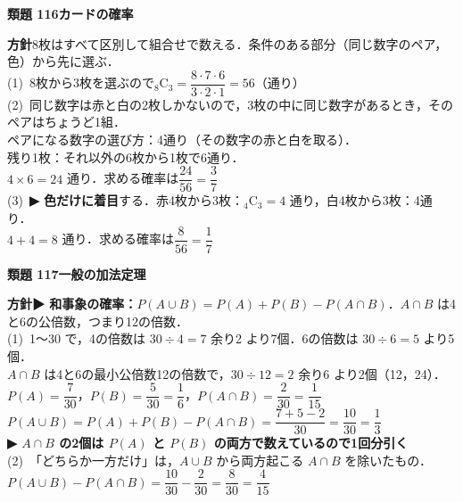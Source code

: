 \documentclass[a4paper,11pt]{ltjsarticle}
\newcommand{\ans}[2]{\Needspace{5\baselineskip}\vspace{6pt}%
  {\sffamily\bfseries 類題 #1\quad #2}\par}
\newcommand{\point}[1]{\textsf{\bfseries ▶ #1}}
\begin{document}
\ans{116}{カードの確率}
\begin{kai}
\textbf{方針}\quad 8枚はすべて区別して組合せで数える．条件のある部分（同じ数字のペア，色）から先に選ぶ．\\[2pt]
(1)\ 8枚から3枚を選ぶので\quad ${}_8\mathrm C_3=\dfrac{8\cdot7\cdot6}{3\cdot2\cdot1}=56$（通り）\\[2pt]
(2)\ 同じ数字は赤と白の2枚しかないので，3枚の中に同じ数字があるとき，そのペアはちょうど1組．\\
\hspace*{1.5em}ペアになる数字の選び方：4通り（その数字の赤と白を取る）．\\
\hspace*{1.5em}残り1枚：それ以外の6枚から1枚で6通り．\\
\hspace*{1.5em}$4\times6=24$ 通り．\quad 求める確率は\quad $\dfrac{24}{56}=\dfrac37$\\[2pt]
(3)\ \point{色だけに着目}する．赤4枚から3枚：${}_4\mathrm C_3=4$ 通り，白4枚から3枚：4通り．\\
\hspace*{1.5em}$4+4=8$ 通り．\quad 求める確率は\quad $\dfrac{8}{56}=\dfrac17$
\end{kai}

\ans{117}{一般の加法定理}
\begin{kai}
\textbf{方針}\quad \point{和事象の確率：$P(A\cup B)=P(A)+P(B)-P(A\cap B)$}．$A\cap B$ は4と6の公倍数，つまり12の倍数．\\[2pt]
(1)\ 1〜30 で，4の倍数は $30\div4=7$ 余り2 より7個．6の倍数は $30\div6=5$ より5個．\\
\hspace*{1.5em}$A\cap B$ は4と6の最小公倍数12の倍数で，$30\div12=2$ 余り6 より2個（12，24）．\\[2pt]
\hspace*{1.5em}$P(A)=\dfrac{7}{30}$，\quad $P(B)=\dfrac{5}{30}=\dfrac16$，\quad $P(A\cap B)=\dfrac{2}{30}=\dfrac1{15}$\\[2pt]
\hspace*{1.5em}$P(A\cup B)=P(A)+P(B)-P(A\cap B)=\dfrac{7+5-2}{30}=\dfrac{10}{30}=\dfrac13$\\
\hspace*{1.5em}\point{$A\cap B$ の2個は $P(A)$ と $P(B)$ の両方で数えているので1回分引く}\\[2pt]
(2)\ 「どちらか一方だけ」は，$A\cup B$ から両方起こる $A\cap B$ を除いたもの．\\
\hspace*{1.5em}$P(A\cup B)-P(A\cap B)=\dfrac{10}{30}-\dfrac{2}{30}=\dfrac{8}{30}=\dfrac{4}{15}$
\end{kai}
\end{document}
